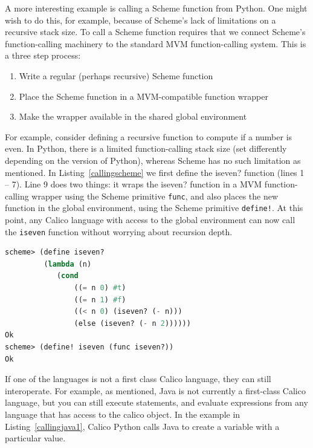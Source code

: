 \documentclass[preprint]{sigplanconf}
\begin{document}
A more interesting example is calling a Scheme function from
Python. One might wish to do this, for example, because of Scheme's
lack of limitations on a recursive stack size. To call a Scheme
function requires that we connect Scheme's function-calling machinery
to the standard MVM function-calling system. This is a three step
process:

\begin{enumerate}
\item Write a regular (perhaps recursive) Scheme function 
\item Place the Scheme function in a MVM-compatible function wrapper
\item Make the wrapper available in the shared global environment
\end{enumerate}

For example, consider defining a recursive function to compute if a
number is even. In Python, there is a limited function-calling stack
size (set differently depending on the version of Python), whereas
Scheme has no such limitation as mentioned. In
Listing~\ref{callingscheme} we first define the iseven? function
(lines 1 -- 7). Line 9 does two things: it wraps the iseven? function
in a MVM function-calling wrapper using the Scheme primitive
\texttt{func}, and also places the new function in the global
environment, using the Scheme primitive \texttt{define!}. At this
point, any Calico language with access to the global environment can
now call the \texttt{iseven} function without worrying about recursion
depth.

\begin{lstlisting}[language=Lisp, keywords={define, lambda, cond, else, func, define!}, caption={Calling Scheme from Python.}, label={callingscheme}]
scheme> (define iseven?
         (lambda (n)
            (cond
                ((= n 0) #t)
                ((= n 1) #f)
                ((< n 0) (iseven? (- n)))
                (else (iseven? (- n 2))))))
Ok
scheme> (define! iseven (func iseven?))
Ok
\end{lstlisting}

If one of the languages is not a first class Calico language, they can
still interoperate. For example, as mentioned, Java is not currently a
first-class Calico language, but you can still execute statements, and
evaluate expressions from any language that has access to the calico
object. In the example in Listing~\ref{callingjava1}, Calico Python
calls Java to create a variable with a particular value.
\end{document}
